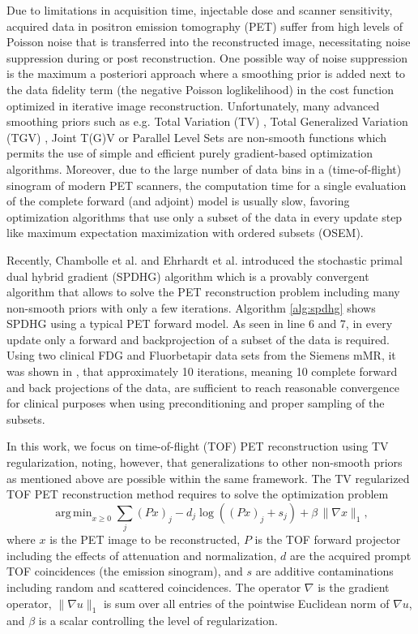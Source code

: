 \documentclass[11pt,twocolumn,twoside]{article}
\DeclareMathOperator*{\argmin}{arg\,min}
\begin{document}
Due to limitations in acquisition time, injectable dose and scanner sensitivity,
acquired data in positron emission tomography (PET) suffer from high levels of
Poisson noise that is transferred into the reconstructed image, necessitating
noise suppression during or post reconstruction.
One possible way of noise suppression is the maximum a posteriori approach
where a smoothing prior is added next to the data fidelity term (the negative
Poisson loglikelihood) in the cost function optimized in iterative image 
reconstruction.
Unfortunately, many advanced smoothing priors such as e.g. Total Variation (TV) \cite{Rudin1992},
Total Generalized Variation (TGV) \cite{Bredies2010}, Joint T(G)V \cite{Rigie2015,Knoll2017}
or Parallel Level Sets \cite{Ehrhardt2016a,Schramm2017} are non-smooth 
functions which permits the use of simple and efficient purely gradient-based
optimization algorithms.
Moreover, due to the large number of data bins in a (time-of-flight) sinogram
of modern PET scanners, the computation time for a single evaluation of the complete
forward (and adjoint) model is usually slow, favoring optimization algorithms that
use only a subset of the data in every update step like maximum expectation maximization
with ordered subsets (OSEM).

Recently, Chambolle et al. \cite{Chambolle2018} and  Ehrhardt et al. \cite{Ehrhardt2019} introduced 
the stochastic primal dual hybrid gradient (SPDHG) algorithm which is a provably convergent algorithm
that allows to solve the PET reconstruction problem including many non-smooth priors with
only a few iterations. 
Algorithm \ref{alg:spdhg} shows SPDHG using a typical PET forward model.
As seen in line 6 and 7, in every update only a forward and backprojection of a subset
of the data is required.
Using two clinical FDG and Fluorbetapir data sets from the Siemens mMR, 
it was shown in \cite{Ehrhardt2019}, that approximately 10 iterations, meaning 10 complete 
forward and back projections of the data, are sufficient to reach reasonable convergence
for clinical purposes when using preconditioning and proper sampling of the subsets.

In this work, we focus on time-of-flight (TOF) PET reconstruction 
using TV regularization, noting, however, that generalizations to other non-smooth priors as mentioned above are possible within the same framework. The TV regularized TOF PET reconstruction method requires to solve the optimization problem
%
\begin{equation}
\argmin _{x\geq 0} \sum_j (Px)_j -  d_j \log \left( (Px)_ j + s_j \right) + \beta \, \|\nabla x\|_{1},
\end{equation}
%
where $x$ is the PET image to be reconstructed, $P$ is the TOF forward projector including the effects
of attenuation and normalization, $d$ are the acquired prompt TOF coincidences (the emission sinogram),
and $s$ are additive contaminations including random and scattered coincidences. The operator $\nabla$ is the gradient operator, $\|\nabla u \|_1$ is sum over all entries of the pointwise Euclidean norm of $\nabla u$, and $\beta$ is a scalar controlling the level of regularization.
\end{document}
